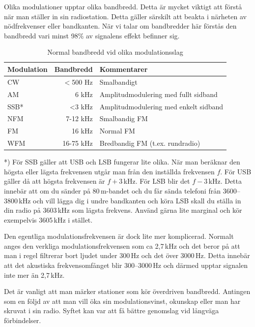 Olika modulationer upptar olika bandbredd. Detta är mycket viktigt att förstå när man ställer in sin radiostation. Detta gäller särskilt att beakta i närheten av nödfrekvenser eller bandkanten. När vi talar om bandbredder här förstås den bandbredd vari minst 98\% av signalens effekt befinner sig.

\begin{table}[H]
\centering
\begin{tabular}{lrl}
	\textbf{Modulation} & \textbf{Bandbredd} & \textbf{Kommentarer}                  \\ \hline
	CW                  &          $<$500 Hz & Smalbandigt                           \\
	AM                  &              6 kHz & Amplitudmodulering med fullt sidband  \\
	SSB*                &              <3 kHz & Amplitudmodulering med enkelt sidband \\
	NFM                 &           7-12 kHz & Smalbandig FM                         \\
	FM                  &             16 kHz & Normal FM                             \\
	WFM                 &          16-75 kHz & Bredbandig FM (t.ex. rundradio)
\end{tabular}
\caption{Normal bandbredd vid olika modulationsslag}
\end{table}

*) För SSB gäller att USB och LSB fungerar lite olika. När man beräknar den högsta eller lägsta frekvensen utgår man från den inställda frekvensen $f$. För USB gäller då att högsta frekvensen är $f+3$\,kHz. För LSB blir det $f-3$\,kHz. Detta innebär att om du sänder på 80\,m-bandet och du får sända telefoni från 3600--3800\,kHz och vill lägga dig i undre bandkanten och köra LSB skall du ställa in din radio på 3603\,kHz som lägsta frekvens. Använd gärna lite marginal och kör exempelvis 3605\,kHz i stället.

Den egentliga modulationsfrekvensen är dock lite mer komplicerad. Normalt anges den verkliga modulationsfrekvensen som ca 2,7\,kHz och det beror på att man i regel filtrerar bort ljudet under 300\,Hz och det över 3000\,Hz. Detta innebär att det akustiska frekvensomfånget blir 300--3000\,Hz och därmed upptar signalen inte mer än 2,7\,kHz.

Det är vanligt att man märker stationer som kör överdriven bandbredd. Antingen som en följd av att man vill öka sin modulationsvinst, okunskap eller man har skruvat i sin radio. Syftet kan var att få bättre genomslag vid långväga förbindelser.

